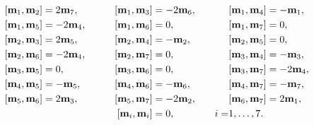 \begin{alignat*}{3}


&[\bold{m}_{1},\bold{m}_{2}]=2\bold{m}_{7}, &\qquad


[\bold{m}_{1},\bold{m}_{3}]&=-2\bold{m}_{6}, &\quad


&[\bold{m}_{1},\bold{m}_{4}]=-\bold{m}_{1}, \\


%


&[\bold{m}_{1},\bold{m}_{5}]=-2\bold{m}_{4}, &\qquad


[\bold{m}_{1},\bold{m}_{6}]&=0, &\quad


&[\bold{m}_{1},\bold{m}_{7}]=0, \\


%


&[\bold{m}_{2},\bold{m}_{3}]=2\bold{m}_{5}, &\qquad


[\bold{m}_{2},\bold{m}_{4}]&=-\bold{m}_{2}, &\quad


&[\bold{m}_{2},\bold{m}_{5}]=0, \\


%


&[\bold{m}_{2},\bold{m}_{6}]=-2\bold{m}_{4}, &\qquad


[\bold{m}_{2},\bold{m}_{7}]&=0, &\quad


&[\bold{m}_{3},\bold{m}_{4}]=-\bold{m}_{3}, \\


%


&[\bold{m}_{3},\bold{m}_{5}]=0, &\qquad


[\bold{m}_{3},\bold{m}_{6}]&=0, &\quad


&[\bold{m}_{3},\bold{m}_{7}]=-2\bold{m}_{4}, \\


%


&[\bold{m}_{4},\bold{m}_{5}]=-\bold{m}_{5}, &\qquad


[\bold{m}_{4},\bold{m}_{6}]&=-\bold{m}_{6}, &\quad


& [\bold{m}_{4},\bold{m}_{7}]=-\bold{m}_{7}, \\


%


&[\bold{m}_{5},\bold{m}_{6}]=2\bold{m}_{3}, &\qquad


[\bold{m}_{5},\bold{m}_{7}]&=-2\bold{m}_{2}, &\quad


&[\bold{m}_{6},\bold{m}_{7}]=2\bold{m}_{1}, \\


%


& & \qquad


[\bold{m}_{i},\bold{m}_{i}]&=0, & \quad i=&1,\dotsc,7.


\end{alignat*}





